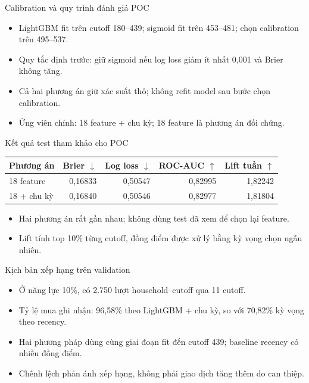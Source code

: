 \documentclass[aspectratio=169,10pt]{beamer}
\begin{document}
\begin{frame}{Calibration và quy trình đánh giá POC}
\begin{itemize}
  \item LightGBM fit trên cutoff 180--439; sigmoid fit trên 453--481; chọn calibration trên 495--537.
  \item Quy tắc định trước: giữ sigmoid nếu log loss giảm ít nhất 0,001 và Brier không tăng.
  \item Cả hai phương án giữ xác suất thô; không refit model sau bước chọn calibration.
  \item Ứng viên chính: 18 feature + chu kỳ; 18 feature là phương án đối chứng.
\end{itemize}
\end{frame}

\begin{frame}{Kết quả test tham khảo cho POC}
\begin{center}
\small
\begin{tabular}{lrrrr}
\toprule
Phương án & Brier $\downarrow$ & Log loss $\downarrow$ & ROC-AUC $\uparrow$ & Lift tuần $\uparrow$ \\
\midrule
18 feature & 0,16833 & 0,50547 & 0,82995 & 1,82242 \\
18 + chu kỳ & 0,16840 & 0,50546 & 0,82977 & 1,81804 \\
\bottomrule
\end{tabular}
\end{center}
\begin{itemize}
  \item Hai phương án rất gần nhau; không dùng test đã xem để chọn lại feature.
  \item Lift tính top 10\% từng cutoff, đồng điểm được xử lý bằng kỳ vọng chọn ngẫu nhiên.
\end{itemize}
\end{frame}

\begin{frame}{Kịch bản xếp hạng trên validation}
\begin{itemize}
  \item Ở năng lực 10\%, có 2.750 lượt household--cutoff qua 11 cutoff.
  \item Tỷ lệ mua ghi nhận: 96,58\% theo LightGBM + chu kỳ, so với 70,82\% kỳ vọng theo recency.
  \item Hai phương pháp dùng cùng giai đoạn fit đến cutoff 439; baseline recency có nhiều đồng điểm.
  \item Chênh lệch phản ánh xếp hạng, không phải giao dịch tăng thêm do can thiệp.
\end{itemize}
\end{frame}
\end{document}
